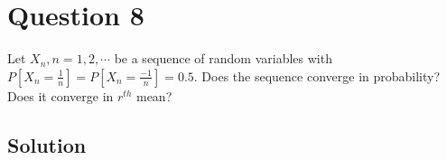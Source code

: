 \section*{Question 8}

Let \( X_{n}, n=1,2, \cdots \) be a sequence of random variables with \( P\left[X_{n}=\frac{1}{n}\right]=P\left[X_{n}=\frac{-1}{n}\right]=0.5 \).
Does the sequence converge in probability?
Does it converge in \( r^{t h} \) mean?

\subsection*{Solution}
